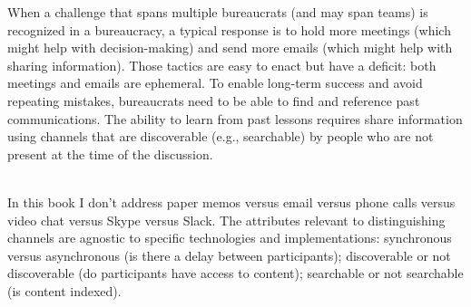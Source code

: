 When a challenge that spans multiple bureaucrats (and may span teams) is recognized in a bureaucracy, a typical response is to hold more meetings (which might help with decision-making) and send more emails (which might help with sharing information). Those tactics are easy to enact but have a deficit: both meetings and emails are ephemeral. To enable long-term success and avoid repeating mistakes, bureaucrats need to be able to find and reference past communications. The ability to learn from past lessons requires share information using channels that are discoverable (e.g., searchable) by people who are not present at the time of the discussion. 

\ \\

In this book I don't address paper memos versus email versus phone calls versus video chat versus Skype versus Slack. 
The attributes relevant to distinguishing channels are agnostic to specific technologies and implementations: synchronous versus asynchronous (is there a delay between participants); discoverable or not discoverable (do participants have access to content); searchable or not searchable (is content indexed). 
